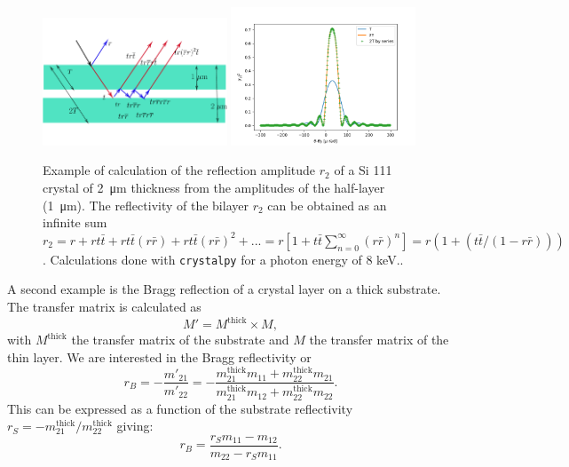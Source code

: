 \documentclass[preprint]{iucr}              %
\begin{document}
\begin{figure}\label{fig:doublelayer}
    \centering
    \includegraphics[width=0.49\textwidth]{figures/figlayered2.pdf}
    \includegraphics[width=0.49\textwidth]{figures/doublelayer2.png}
    \caption{Example of calculation of the reflection amplitude $r_2$ of a Si 111 crystal of \SI{2}{\micro\meter} thickness from the amplitudes of the half-layer (\SI{1}{\micro\meter}). The reflectivity of the bilayer $r_2$ can be obtained as an infinite sum $r_2 = r + r t \bar{t} + r t \bar{t} (r \bar{r}) + r t \bar{t} (r \bar{r})^2 + ...= r[1 + t \bar{t}\sum_{n=0}^{\infty}(r\bar{r})^n]=r(1 + (t \bar{t} / (1-r \bar{r})))$. Calculations done with {\tt crystalpy} for a photon energy of 8 keV..}
\end{figure}


A second example is the Bragg reflection of a crystal layer on a thick substrate. The transfer matrix is calculated as
\begin{equation}
    M' = M^{\text{thick}} \times M,
\end{equation}
with $M^{\text{thick}}$ the transfer matrix of the substrate and $M$ the transfer matrix of the thin layer. We are interested in the Bragg reflectivity or 
\begin{equation}
r_B=-\frac{m'_{21}}{m'_{22}}=
-\frac{m_{21}^{\text{thick}} m_{11} + m_{22}^{\text{thick}} m_{21}}
{m_{21}^{\text{thick}} m_{12} + m_{22}^{\text{thick}} m_{22}}.
\end{equation}
This can be expressed as a function of the substrate reflectivity $r_S=-m_{21}^{\text{thick}}/m_{22}^{\text{thick}}$ giving: 
\begin{equation}
r_B=\frac{r_S m_{11} - m_{12}}
{m_{22}  - r_S m_{11}}.
\end{equation}
\end{document}
